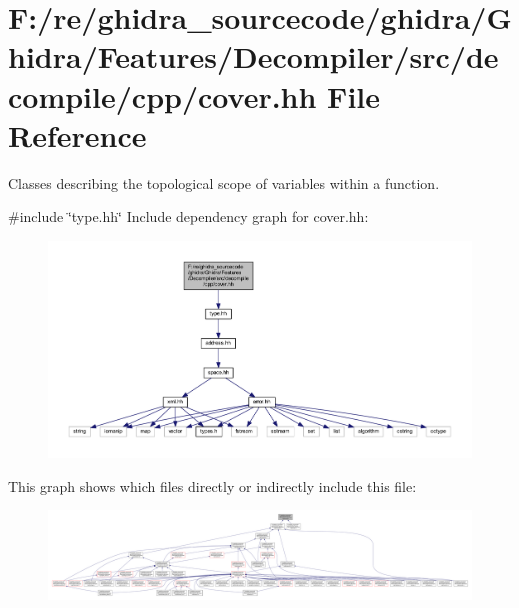 \hypertarget{cover_8hh}{}\section{F\+:/re/ghidra\+\_\+sourcecode/ghidra/\+Ghidra/\+Features/\+Decompiler/src/decompile/cpp/cover.hh File Reference}
\label{cover_8hh}


Classes describing the topological scope of variables within a function.  


{\ttfamily \#include \char`\"{}type.\+hh\char`\"{}}\newline
Include dependency graph for cover.\+hh\+:
\nopagebreak
\begin{figure}[H]
\begin{center}
\leavevmode
\includegraphics[width=350pt]{cover_8hh__incl}
\end{center}
\end{figure}
This graph shows which files directly or indirectly include this file\+:
\nopagebreak
\begin{figure}[H]
\begin{center}
\leavevmode
\includegraphics[width=350pt]{cover_8hh__dep__incl}
\end{center}
\end{figure}
